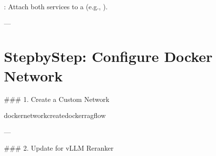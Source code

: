\documentclass[letterpaper,10pt,english]{sphinxmanual}
\begin{document}
\sphinxAtStartPar
{}: Attach both services to a  (e.g., ).

\sphinxAtStartPar
—


\section{Step\sphinxhyphen{}by\sphinxhyphen{}Step: Configure Docker Network}
\label{\detokenize{vllm-network:step-by-step-configure-docker-network}}
\sphinxAtStartPar
\#\#\# 1. Create a Custom Network

\begin{sphinxVerbatim}[commandchars=\\\{\}]
dockernetworkcreatedocker\PYGZhy{}ragflow
\end{sphinxVerbatim}

\sphinxAtStartPar
—

\sphinxAtStartPar
\#\#\# 2. Update  for vLLM Reranker
\end{document}
